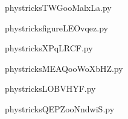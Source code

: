     \newcommand{\CaptionFigTWGooMalxLa}{<+Type your caption here+>}
    \begin{center}
        
    \end{center}
    phystricksTWGooMalxLa.py

    

    \clearpage
    


    \newcommand{\CaptionFigfigureLEOvqez}{<+Type your caption here+>}
    \begin{center}
        
    \end{center}
    phystricksfigureLEOvqez.py

    

    \clearpage
    


    \newcommand{\CaptionFigXPqLRCF}{<+Type your caption here+>}
    \begin{center}
        
    \end{center}
    phystricksXPqLRCF.py

    

    \clearpage
    


    \newcommand{\CaptionFigMEAQooWoXbHZ}{<+Type your caption here+>}
    \begin{center}
        
    \end{center}
    phystricksMEAQooWoXbHZ.py

    

    \clearpage
    


    \newcommand{\CaptionFigLOBVHYF}{<+Type your caption here+>}
    \begin{center}
        
    \end{center}
    phystricksLOBVHYF.py

    

    \clearpage
    


    \newcommand{\CaptionFigQEPZooNndwiS}{<+Type your caption here+>}
    \begin{center}
        
    \end{center}
    phystricksQEPZooNndwiS.py

